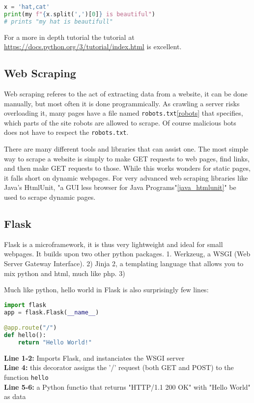 \documentclass[]{report}   %
\begin{document}
\begin{lstlisting}[language=python]
x = 'hat,cat'
print(my f"{x.split(',')[0]} is beautiful")
# prints "my hat is beautifull"
\end{lstlisting}

For a more in depth tutorial the tutorial at \url{
https://docs.python.org/3/tutorial/index.html} is excellent.

\subsection{Web Scraping}
Web scraping referes to the act of extracting data from a website, it can be
done manually, but most often it is done programmically. As crawling a server
risks overloading it, many pages have a file named
\texttt{robots.txt}\ref{robots} that specifies, which parts of the site robots
are allowed to scrape. Of course malicious bots does not have to respect the
\texttt{robots.txt}.

There are many different tools and libraries that can assist one. The most
simple way to scrape a website is simply to make GET requests to web pages,
find links, and then make GET requests to those. While this works wonders for
static pages, it falls short on dynamic webpages. For very advanced web
scraping libraries like Java's HtmlUnit, "a GUI less browser for Java
Programs"\ref{java_htmlunit}" be used to scrape dynamic pages.

\subsection{Flask}
Flask is a microframework, it is thus very lightweight and ideal for small
webpages. It builds upon two other python packages. 1. Werkzeug, a WSGI (Web
Server Gateway Interface). 2) Jinja 2, a templating language that allows you to
mix python and html, much like php. 3) 

Much like python, hello world in Flask is also surprisingly few lines:

\begin{lstlisting}[language=python]
import flask
app = flask.Flask(__name__)

@app.route("/")
def hello():
    return "Hello World!"
\end{lstlisting}

\textbf{Line 1-2:} Imports Flask, and instanciates the WSGI server \\
\textbf{Line 4:} this decorator assigns the '/' request (both GET and POST) to
the function \texttt{hello} \\
\textbf{Line 5-6:} a Python functio that returns "HTTP/1.1 200 OK" with "Hello
World" as data \\
\end{document}
